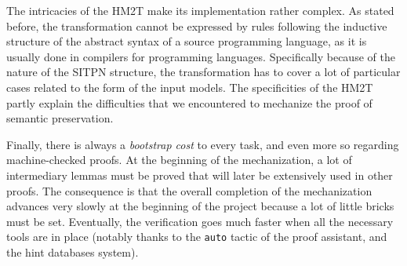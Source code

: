 \documentclass[pdflatex,sn-mathphys]{sn-jnl}%
\theoremstyle{thmstyleone}%
\theoremstyle{thmstyletwo}%
\theoremstyle{thmstylethree}%
\begin{document}
The intricacies of the HM2T make its \coq{} implementation rather
complex.  As stated before, the transformation cannot be expressed by
rules following the inductive structure of the abstract syntax of a
source programming language, as it is usually done in compilers for
programming languages. Specifically because of the nature of the SITPN
structure, the \hilecop{} transformation has to cover a lot of
particular cases related to the form of the input models. The
specificities of the HM2T partly explain the difficulties that we
encountered to mechanize the proof of semantic preservation.

Finally, there is always a \textit{bootstrap cost} to every task, and
even more so regarding machine-checked proofs. At the beginning of the
mechanization, a lot of intermediary lemmas must be proved that will
later be extensively used in other proofs. The consequence is that the
overall completion of the mechanization advances very slowly at the
beginning of the project because a lot of little bricks must be
set. Eventually, the verification goes much faster when all the
necessary tools are in place (notably thanks to the \texttt{auto}
tactic of the \coq{} proof assistant, and the hint databases system).



  
\end{document}

